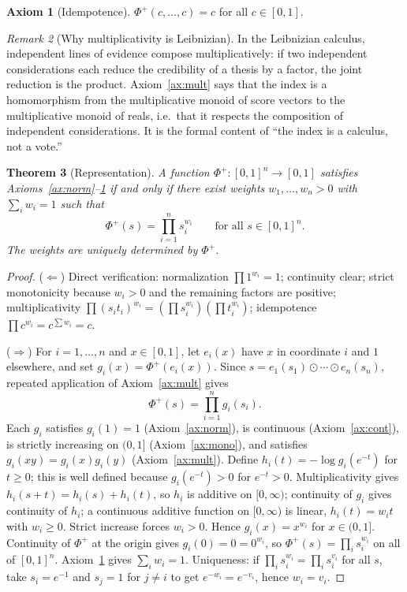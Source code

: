 \documentclass[11pt]{article}
\newtheorem{theorem}{Theorem}[section]
\theoremstyle{definition}
\newtheorem{axiom}[theorem]{Axiom}
\theoremstyle{remark}
\newtheorem{remark}[theorem]{Remark}
\newcommand{\Ph}{\Phi^{+}}
\begin{document}
\begin{axiom}[Idempotence]\label{ax:idem}
$\Ph(c,\dots,c)=c$ for all $c\in[0,1]$.
\end{axiom}

\begin{remark}[Why multiplicativity is Leibnizian]\label{rem:leibniz-mult}
In the Leibnizian calculus, independent lines of evidence compose multiplicatively: if two independent considerations each reduce the credibility of a thesis by a factor, the joint reduction is the product. Axiom~\ref{ax:mult} says that the index is a homomorphism from the multiplicative monoid of score vectors to the multiplicative monoid of reals, i.e.\ that it respects the composition of independent considerations. It is the formal content of ``the index is a calculus, not a vote.''
\end{remark}

\begin{theorem}[Representation]\label{thm:rep}
A function $\Ph\colon[0,1]^n\to[0,1]$ satisfies Axioms~\ref{ax:norm}--\ref{ax:idem} if and only if there exist weights $w_1,\dots,w_n>0$ with $\sum_i w_i=1$ such that
\[
\Ph(s)=\prod_{i=1}^n s_i^{w_i}\qquad\text{for all } s\in[0,1]^n.
\]
The weights are uniquely determined by $\Ph$.
\end{theorem}

\begin{proof}
($\Leftarrow$) Direct verification: normalization $\prod 1^{w_i}=1$; continuity clear; strict monotonicity because $w_i>0$ and the remaining factors are positive; multiplicativity $\prod(s_it_i)^{w_i}=(\prod s_i^{w_i})(\prod t_i^{w_i})$; idempotence $\prod c^{w_i}=c^{\sum w_i}=c$.

($\Rightarrow$) For $i=1,\dots,n$ and $x\in[0,1]$, let $e_i(x)$ have $x$ in coordinate $i$ and $1$ elsewhere, and set $g_i(x)=\Ph(e_i(x))$. Since $s=e_1(s_1)\odot\cdots\odot e_n(s_n)$, repeated application of Axiom~\ref{ax:mult} gives
\begin{equation}\label{eq:factor}
\Ph(s)=\prod_{i=1}^n g_i(s_i).
\end{equation}
Each $g_i$ satisfies $g_i(1)=1$ (Axiom~\ref{ax:norm}), is continuous (Axiom~\ref{ax:cont}), is strictly increasing on $(0,1]$ (Axiom~\ref{ax:mono}), and satisfies $g_i(xy)=g_i(x)g_i(y)$ (Axiom~\ref{ax:mult}). Define $h_i(t)=-\log g_i(e^{-t})$ for $t\ge 0$; this is well defined because $g_i(e^{-t})>0$ for $e^{-t}>0$. Multiplicativity gives $h_i(s+t)=h_i(s)+h_i(t)$, so $h_i$ is additive on $[0,\infty)$; continuity of $g_i$ gives continuity of $h_i$; a continuous additive function on $[0,\infty)$ is linear, $h_i(t)=w_it$ with $w_i\ge 0$. Strict increase forces $w_i>0$. Hence $g_i(x)=x^{w_i}$ for $x\in(0,1]$. Continuity of $\Ph$ at the origin gives $g_i(0)=0=0^{w_i}$, so $\Ph(s)=\prod_i s_i^{w_i}$ on all of $[0,1]^n$. Axiom~\ref{ax:idem} gives $\sum_i w_i=1$. Uniqueness: if $\prod_i s_i^{w_i}=\prod_i s_i^{v_i}$ for all $s$, take $s_i=e^{-1}$ and $s_j=1$ for $j\ne i$ to get $e^{-w_i}=e^{-v_i}$, hence $w_i=v_i$.
\end{proof}
\end{document}

